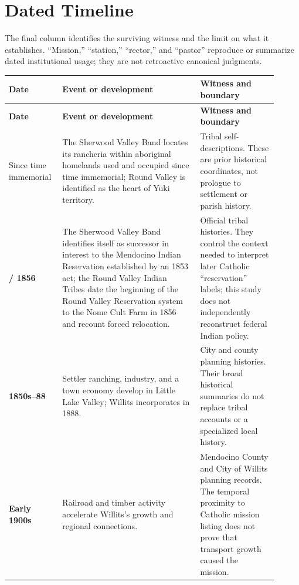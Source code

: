 \section{Dated Timeline}

The final column identifies the surviving witness and the limit on what it establishes. ``Mission,'' ``station,'' ``rector,'' and ``pastor'' reproduce or summarize dated institutional usage; they are not retroactive canonical judgments.

\begin{longtable}{>{\bfseries\RaggedRight\arraybackslash}p{0.16\linewidth}>{\RaggedRight\arraybackslash}p{0.48\linewidth}>{\RaggedRight\arraybackslash}p{0.27\linewidth}}
\toprule
\textbf{Date} & \textbf{Event or development} & \textbf{Witness and boundary}\\
\midrule
\endfirsthead
\toprule
\textbf{Date} & \textbf{Event or development} & \textbf{Witness and boundary}\\
\midrule
\endhead
\bottomrule
\endfoot

Since time immemorial & The Sherwood Valley Band locates its rancheria within aboriginal homelands used and occupied since time immemorial; Round Valley is identified as the heart of Yuki territory. & Tribal self-descriptions. These are prior historical coordinates, not prologue to settlement or parish history.\\

1853 / 1856 & The Sherwood Valley Band identifies itself as successor in interest to the Mendocino Indian Reservation established by an 1853 act; the Round Valley Indian Tribes date the beginning of the Round Valley Reservation system to the Nome Cult Farm in 1856 and recount forced relocation. & Official tribal histories. They control the context needed to interpret later Catholic ``reservation'' labels; this study does not independently reconstruct federal Indian policy.\\

1850s--88 & Settler ranching, industry, and a town economy develop in Little Lake Valley; Willits incorporates in 1888. & City and county planning histories. Their broad historical summaries do not replace tribal accounts or a specialized local history.\\

Early 1900s & Railroad and timber activity accelerate Willits's growth and regional connections. & Mendocino County and City of Willits planning records. The temporal proximity to Catholic mission listing does not prove that transport growth caused the mission.\\


\end{longtable}
